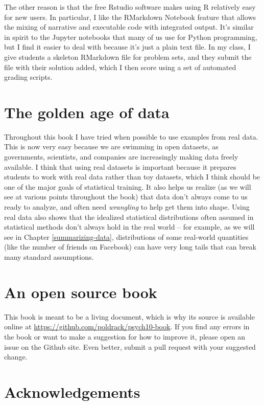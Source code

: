 \documentclass[]{book}
\theoremstyle{definition}
\theoremstyle{definition}
\theoremstyle{definition}
\theoremstyle{remark}
\begin{document}
The other reason is that the free Rstudio software makes using R
relatively easy for new users. In particular, I like the RMarkdown
Notebook feature that allows the mixing of narrative and executable code
with integrated output. It's similar in spirit to the Jupyter notebooks
that many of us use for Python programming, but I find it easier to deal
with because it's just a plain text file. In my class, I give students a
skeleton RMarkdown file for problem sets, and they submit the file with
their solution added, which I then score using a set of automated
grading scripts.

\section{The golden age of data}\label{the-golden-age-of-data}

Throughout this book I have tried when possible to use examples from
real data. This is now very easy because we are swimming in open
datasets, as governments, scientists, and companies are increasingly
making data freely available. I think that using real datasets is
important because it prepares students to work with real data rather
than toy datasets, which I think should be one of the major goals of
statistical training. It also helps us realize (as we will see at
various points throughout the book) that data don't always come to us
ready to analyze, and often need \emph{wrangling} to help get them into
shape. Using real data also shows that the idealized statistical
distributions often assumed in statistical methods don't always hold in
the real world -- for example, as we will see in Chapter
\ref{summarizing-data}, distributions of some real-world quantities
(like the number of friends on Facebook) can have very long tails that
can break many standard assumptions.

\section{An open source book}\label{an-open-source-book}

This book is meant to be a living document, which is why its source is
available online at \url{https://github.com/poldrack/psych10-book}. If
you find any errors in the book or want to make a suggestion for how to
improve it, please open an issue on the Github site. Even better, submit
a pull request with your suggested change.

\section{Acknowledgements}\label{acknowledgements}
\end{document}
